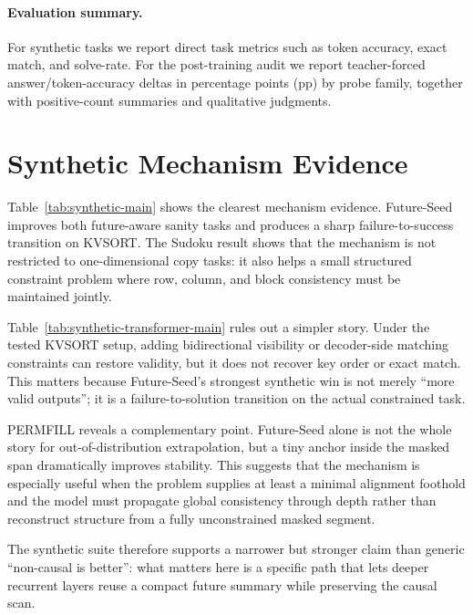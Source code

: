 \documentclass{article}
\begin{document}
\paragraph{Evaluation summary.}
For synthetic tasks we report direct task metrics such as token accuracy, exact match, and solve-rate. For the post-training audit we report teacher-forced answer/token-accuracy deltas in percentage points (pp) by probe family, together with positive-count summaries and qualitative judgments.

\section{Synthetic Mechanism Evidence}


Table~\ref{tab:synthetic-main} shows the clearest mechanism evidence. Future-Seed improves both future-aware sanity tasks and produces a sharp failure-to-success transition on KVSORT. The Sudoku result shows that the mechanism is not restricted to one-dimensional copy tasks: it also helps a small structured constraint problem where row, column, and block consistency must be maintained jointly.



Table~\ref{tab:synthetic-transformer-main} rules out a simpler story. Under the tested KVSORT setup, adding bidirectional visibility or decoder-side matching constraints can restore validity, but it does not recover key order or exact match. This matters because Future-Seed's strongest synthetic win is not merely ``more valid outputs''; it is a failure-to-solution transition on the actual constrained task.



PERMFILL reveals a complementary point. Future-Seed alone is not the whole story for out-of-distribution extrapolation, but a tiny anchor inside the masked span dramatically improves stability. This suggests that the mechanism is especially useful when the problem supplies at least a minimal alignment foothold and the model must propagate global consistency through depth rather than reconstruct structure from a fully unconstrained masked segment.

The synthetic suite therefore supports a narrower but stronger claim than generic ``non-causal is better'': what matters here is a specific path that lets deeper recurrent layers reuse a compact future summary while preserving the causal scan.
\end{document}
